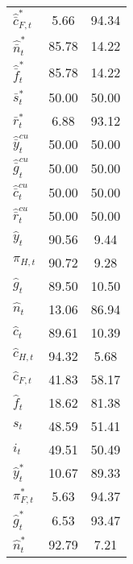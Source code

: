 \begin{center}
\begin{longtable}{lcc}
${\hat {\bar c}_{F,t}^*}  $	 & 	              5.66	 & 	             94.34 \\ 
${\hat {\bar n}_t^*}      $	 & 	             85.78	 & 	             14.22 \\ 
${\hat {\bar f}_t^*}      $	 & 	             85.78	 & 	             14.22 \\ 
${\bar s_t^*}             $	 & 	             50.00	 & 	             50.00 \\ 
${\bar r_t^*}             $	 & 	              6.88	 & 	             93.12 \\ 
${\hat {\bar y}_t^{cu}}   $	 & 	             50.00	 & 	             50.00 \\ 
${\hat {\bar g}_t^{cu}}   $	 & 	             50.00	 & 	             50.00 \\ 
${\hat {\bar c}_t^{cu}}   $	 & 	             50.00	 & 	             50.00 \\ 
${\hat {\bar r}_t^{cu}}   $	 & 	             50.00	 & 	             50.00 \\ 
${\hat y_t}               $	 & 	             90.56	 & 	              9.44 \\ 
${\pi_{H,t}}              $	 & 	             90.72	 & 	              9.28 \\ 
${\hat g_t}               $	 & 	             89.50	 & 	             10.50 \\ 
${\hat n_t}               $	 & 	             13.06	 & 	             86.94 \\ 
${\hat c_t}               $	 & 	             89.61	 & 	             10.39 \\ 
${\hat c_{H,t}}           $	 & 	             94.32	 & 	              5.68 \\ 
${\hat c_{F,t}}           $	 & 	             41.83	 & 	             58.17 \\ 
${\hat f_t}               $	 & 	             18.62	 & 	             81.38 \\ 
${s_t}                    $	 & 	             48.59	 & 	             51.41 \\ 
${i_t}                    $	 & 	             49.51	 & 	             50.49 \\ 
${\hat y_t^*}             $	 & 	             10.67	 & 	             89.33 \\ 
${\pi_{F,t}^*}            $	 & 	              5.63	 & 	             94.37 \\ 
${\hat g_t^*}             $	 & 	              6.53	 & 	             93.47 \\ 
${\hat n_t^*}             $	 & 	             92.79	 & 	              7.21 \\ 

\end{longtable}
\end{center}

